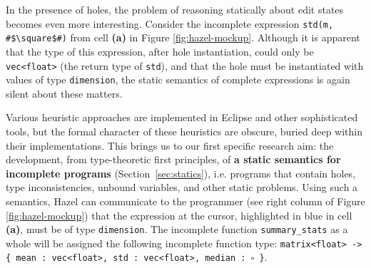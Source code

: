 \documentclass{purple}
\let\li\lstinline
\newcommand{\Hazel}[0]{\textsf{Hazel}\xspace}
\newcommand{\HazelEnv}[0]{\Hazel\xspace}
\begin{document}
In the presence of holes, the problem of reasoning statically about edit states
becomes even more interesting.  Consider the incomplete expression \lstinline{std(m, #$\square$#)} 
from cell \textbf{(a)} in Figure \ref{fig:hazel-mockup}.
%
%
Although it is apparent that the type of this expression, after hole instantiation, could only be \lstinline{vec<float>} (the return type of \lstinline{std}),
and that the hole must be instantiated with values of type \li{dimension}, the static
semantics of complete expressions is again silent about these matters. 

Various heuristic
approaches are implemented in Eclipse and other sophisticated tools, but the 
formal character of these heuristics are obscure, buried deep within their implementations. This brings us to our first specific research aim: the 
development, from type-theoretic first principles, of \textbf{a static semantics for incomplete programs} (Section~\ref{sec:statics}),
i.e. programs that contain holes, type inconsistencies, unbound variables, and
other static problems. Using such a semantics, \HazelEnv can 
communicate to the programmer (see right column of Figure \ref{fig:hazel-mockup}) that the expression at the cursor, highlighted in blue in cell \textbf{(a)}, must be of type \li{dimension}. The incomplete function
\li{summary_stats} as a whole will be assigned the following incomplete function
type: \texttt{matrix<float> -> \{ {mean} : vec<float>, std : vec<float>, median :~$\square$ \}}.
\end{document}
